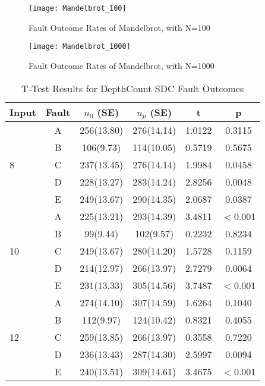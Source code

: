 \begin{figure}[htbp]
  \centering
  \texttt{[image: Mandelbrot\_100]}
  \caption{Fault Outcome Rates of Mandelbrot, with N=100}
  \label{fig:Mandelbrot_100}
\end{figure}

\begin{figure}[htbp]
  \centering
  \texttt{[image: Mandelbrot\_1000]}
  \caption{Fault Outcome Rates of Mandelbrot, with N=1000}
  \label{fig:Mandelbrot_1000}
\end{figure}


\begin{table}[htbp]
\small{
\begin{center}
    \begin{tabular}{|p{0.7cm}|c|c|c|c|c|}
    \hline
    \textbf{Input} & \textbf{Fault} & \textbf{$n_0$ (SE)} & \textbf{$n_p$ (SE)} & \textbf{t} & \textbf{p} \\ \hline
    \multirow{5}{*}{8}
    & A & 256(13.80) & 276(14.14) & 1.0122 & 0.3115 \\
	& B & 106(9.73) & 114(10.05) & 0.5719 & 0.5675 \\
 	& C & 237(13.45) & 276(14.14) & 1.9984 & 0.0458 \\
 	& D & 228(13.27) & 283(14.24) & 2.8256 & 0.0048 \\
 	& E & 249(13.67) & 290(14.35) & 2.0687 & 0.0387 \\ \hline
    \multirow{5}{*}{10}
    & A & 225(13.21) & 293(14.39) & 3.4811 & $<$0.001 \\
	& B & 99(9.44) & 102(9.57) & 0.2232 & 0.8234 \\
 	& C & 249(13.67) & 280(14.20) & 1.5728 & 0.1159 \\
 	& D & 214(12.97) & 266(13.97) & 2.7279 & 0.0064 \\
 	& E & 231(13.33) & 305(14.56) & 3.7487 & $<$0.001 \\ \hline
 	\multirow{5}{*}{12}
    & A & 274(14.10) & 307(14.59) & 1.6264 & 0.1040 \\
	& B & 112(9.97) & 124(10.42) & 0.8321 & 0.4055 \\
 	& C & 259(13.85) & 266(13.97) & 0.3558 & 0.7220 \\
 	& D & 236(13.43) & 287(14.30) & 2.5997 & 0.0094 \\
 	& E & 240(13.51) & 309(14.61) & 3.4675 & $<$0.001 \\ \hline
    \hline
    \end{tabular}
    \end{center}
    }
    \caption{T-Test Results for DepthCount SDC Fault Outcomes}
    \label{tab:DepthCount_TTest}
\end{table}

